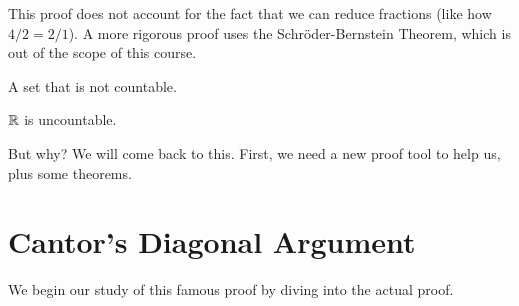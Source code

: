 \documentclass[main.tex]{subfiles}
\begin{document}
\begin{rem}
	This proof does not account for the fact that we can reduce fractions (like how \(4/2 = 2/1\)).
	A more rigorous proof uses the Schr\"{o}der-Bernstein Theorem, which is out of the scope of this course.
\end{rem}

\begin{defn}
	A set that is not countable.
\end{defn}

\begin{example}
	\(\mathbb{R}\) is uncountable.
\end{example}

But why? We will come back to this. First, we need a new proof tool to help us, plus some theorems.

\section{Cantor's Diagonal Argument}

We begin our study of this famous proof by diving into the actual proof.
\end{document}
